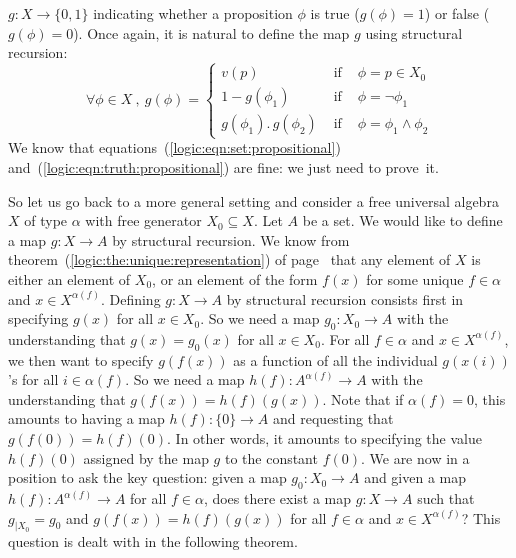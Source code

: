 $g:X\to\{0,1\}$ indicating whether a proposition $\phi$ is true
($g(\phi)=1$) or false ($g(\phi)=0$). Once again, it is natural to
define the map $g$ using structural recursion:
 \begin{equation}\label{logic:eqn:truth:propositional}
    \forall\phi\in X\ ,\ g(\phi)=\left\{
                    \begin{array}{lcl}
                    v(p)&\mbox{\ if\ }&\phi=p\in X_{0}\\
                    1-g(\phi_{1})&\mbox{\ if\ }&\phi=\lnot\phi_{1}\\
                    g(\phi_{1}).\,g(\phi_{2})&\mbox{\ if\ }&\phi=\phi_{1}\land\phi_{2}
                    \end{array}\right.
    \end{equation}
We know that equations~(\ref{logic:eqn:set:propositional})
and~(\ref{logic:eqn:truth:propositional}) are fine: we just need to
prove~it.

So let us go back to a more general setting and consider a free
universal algebra $X$ of type $\alpha$ with free generator
$X_{0}\subseteq X$. Let $A$ be a set. We would like to define a map
$g:X\to A$ by structural recursion. We know from
theorem~(\ref{logic:the:unique:representation}) of
page~\pageref{logic:the:unique:representation} that any element of
$X$ is either an element of $X_{0}$, or an element of the form
$f(x)$ for some unique $f\in\alpha$ and $x\in X^{\alpha(f)}$.
Defining $g:X\to A$ by structural recursion consists first in
specifying $g(x)$ for all $x\in X_{0}$. So we need a map
$g_{0}:X_{0}\to A$ with the understanding that $g(x)=g_{0}(x)$ for
all $x\in X_{0}$. For all $f\in\alpha$ and $x\in X^{\alpha(f)}$, we
then want to specify $g(f(x))$ as a function of all the individual
$g(x(i))$'s for all $i\in\alpha(f)$. So we need a map
$h(f):A^{\alpha(f)}\to A$ with the understanding that
$g(f(x))=h(f)(g(x))$. Note that if $\alpha(f)=0$, this amounts to
having a map $h(f):\{0\}\to A$ and requesting that
$g(f(0))=h(f)(0)$. In other words, it amounts to specifying the
value $h(f)(0)$ assigned by the map $g$ to the constant $f(0)$. We
are now in a position to ask the key question: given a map
$g_{0}:X_{0}\to A$ and given a map $h(f):A^{\alpha(f)}\to A$ for all
$f\in\alpha$, does there exist a map $g:X\to A$ such that
$g_{|X_{0}}=g_{0}$ and $g(f(x))=h(f)(g(x))$ for all $f\in\alpha$ and
$x\in X^{\alpha(f)}$? This question is dealt with in the following
theorem.

